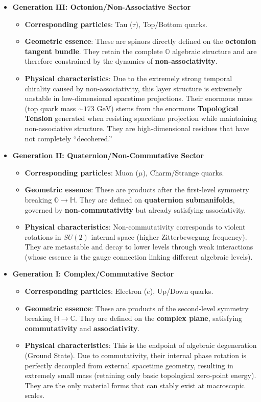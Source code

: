 \begin{itemize}
\item \textbf{Generation III: Octonion/Non-Associative Sector}
  \begin{itemize}
  \item \textbf{Corresponding particles}: Tau ($\tau$), Top/Bottom quarks.
  \item \textbf{Geometric essence}: These are spinors directly defined on the \textbf{octonion tangent bundle}. They retain the complete $\mathbb{O}$ algebraic structure and are therefore constrained by the dynamics of \textbf{non-associativity}.
  \item \textbf{Physical characteristics}: Due to the extremely strong temporal chirality caused by non-associativity, this layer structure is extremely unstable in low-dimensional spacetime projections. Their enormous mass (top quark mass $\sim 173 \text{ GeV}$) stems from the enormous \textbf{Topological Tension} generated when resisting spacetime projection while maintaining non-associative structure. They are high-dimensional residues that have not completely ``decohered.''
  \end{itemize}

\item \textbf{Generation II: Quaternion/Non-Commutative Sector}
  \begin{itemize}
  \item \textbf{Corresponding particles}: Muon ($\mu$), Charm/Strange quarks.
  \item \textbf{Geometric essence}: These are products after the first-level symmetry breaking $\mathbb{O} \to \mathbb{H}$. They are defined on \textbf{quaternion submanifolds}, governed by \textbf{non-commutativity} but already satisfying associativity.
  \item \textbf{Physical characteristics}: Non-commutativity corresponds to violent rotations in $SU(2)$ internal space (higher Zitterbewegung frequency). They are metastable and decay to lower levels through weak interactions (whose essence is the gauge connection linking different algebraic levels).
  \end{itemize}

\item \textbf{Generation I: Complex/Commutative Sector}
  \begin{itemize}
  \item \textbf{Corresponding particles}: Electron ($e$), Up/Down quarks.
  \item \textbf{Geometric essence}: These are products of the second-level symmetry breaking $\mathbb{H} \to \mathbb{C}$. They are defined on the \textbf{complex plane}, satisfying \textbf{commutativity} and \textbf{associativity}.
  \item \textbf{Physical characteristics}: This is the endpoint of algebraic degeneration (Ground State). Due to commutativity, their internal phase rotation is perfectly decoupled from external spacetime geometry, resulting in extremely small mass (retaining only basic topological zero-point energy). They are the only material forms that can stably exist at macroscopic scales.
  \end{itemize}
\end{itemize}


